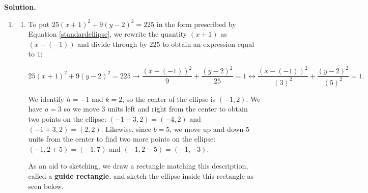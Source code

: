 \documentclass{ximera}
\begin{document}
\begin{example}
\begin{enumerate}
\begin{enumerate}
\begin{image}

\end{image}


\end{enumerate}


\end{enumerate}

 

{\bf Solution.} 

\begin{enumerate}

\item 

\begin{enumerate}

\item To put   $25(x+1)^2 + 9 (y-2)^2 = 225$ in the form prescribed by Equation \ref{standardellipse}, we rewrite the quantity $(x+1)$ as $(x-(-1))$ and divide through by $225$ to obtain an expression equal to $1$:  

\[  25 (x+1)^2 + 9 (y-2)^2 = 225 \rightarrow \frac{(x-(-1))^2}{9}  + \frac{(y-2)^2}{25} = 1 \leftrightarrow  \frac{(x-(-1))^2}{(3)^2}  + \frac{(y-2)^2}{(5)^2} = 1.  \]

We identify $h = -1$ and  $k = 2$, so the center of the ellipse is $(-1,2)$.  We have $a = 3$ so  we move $3$ units left and right from the center to obtain two points on the ellipse:  $(-1-3, 2) = (-4,2)$ and $(-1+3, 2) = (2,2)$.  Likewise, since $b=5$, we move up and down $5$ units from the center to find two more points on the ellipse: $(-1,2+5) = (-1,7)$ and $(-1, 2-5) = (-1,-3)$.

 

As an aid to sketching, we draw a rectangle matching this description, called a \textbf{guide rectangle}, and sketch the ellipse inside this rectangle as seen below.

\begin{image}
\end{image}
\end{enumerate}
\end{enumerate}
\end{example}
\end{document}
